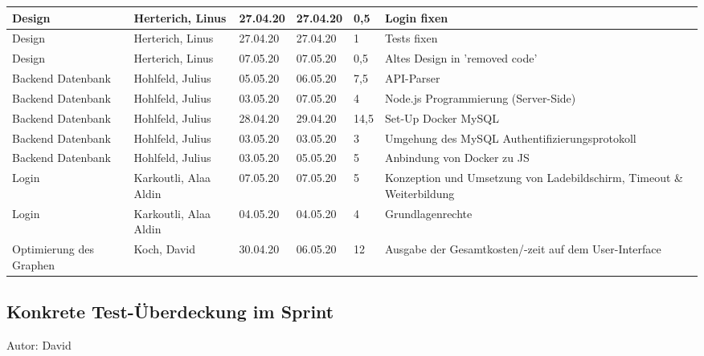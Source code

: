 \begin{longtable}{|p{4cm}|p{2cm}|p{1.2cm}|p{1.2cm}|p{0.7cm}|p{3.8cm}|}
  Design                                                                & Herterich, Linus      & 27.04.20 & 27.04.20 & 0,5   & Login fixen \\
  \hline
  Design                                                                & Herterich, Linus      & 27.04.20 & 27.04.20 & 1     & Tests fixen \\
  \hline
  Design                                                                & Herterich, Linus      & 07.05.20 & 07.05.20 & 0,5   & Altes Design in 'removed code' \\
  \hline
  Backend Datenbank                                                     & Hohlfeld, Julius      & 05.05.20 & 06.05.20 & 7,5   & API-Parser \\
  \hline
  Backend Datenbank                                                     & Hohlfeld, Julius      & 03.05.20 & 07.05.20 & 4     & Node.js Programmierung (Server-Side) \\
  \hline
  Backend Datenbank                                                     & Hohlfeld, Julius      & 28.04.20 & 29.04.20 & 14,5  & Set-Up Docker MySQL \\
  \hline
  Backend Datenbank                                                     & Hohlfeld, Julius      & 03.05.20 & 03.05.20 & 3     & Umgehung des MySQL Authentifizierungsprotokoll \\
  \hline
  Backend Datenbank                                                     & Hohlfeld, Julius      & 03.05.20 & 05.05.20 & 5     & Anbindung von Docker zu JS \\
  \hline
  Login                                                                 & Karkoutli, Alaa Aldin & 07.05.20 & 07.05.20 & 5     & Konzeption und Umsetzung von Ladebildschirm, Timeout \& Weiterbildung \\
  \hline
  Login                                                                 & Karkoutli, Alaa Aldin & 04.05.20 & 04.05.20 & 4     & Grundlagenrechte \\
  \hline
  Optimierung des Graphen                                               & Koch, David           & 30.04.20 & 06.05.20 & 12    & Ausgabe der Gesamtkosten/-zeit auf dem User-Interface \\
  \hline
\end{longtable}

\subsection{Konkrete Test-Überdeckung im Sprint}
{\small Autor: David}

